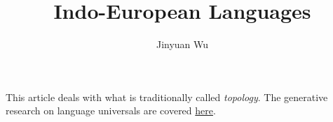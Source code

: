 \documentclass[a4paper]{article}
\title{Indo-European Languages}
\author{Jinyuan Wu}
\begin{document}
\maketitle

This article deals with what is traditionally called \emph{topology}. The generative research on language universals
are covered \href{language-universal.pdf}{here}.
\end{document}
